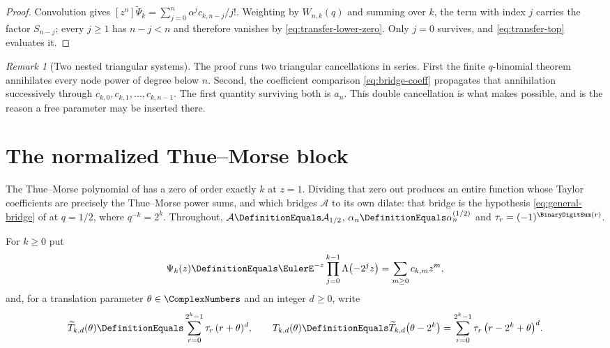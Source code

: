 \documentclass[11pt,a4paper,oneside,openany]{book}
\theoremstyle{definition}
\theoremstyle{remark}
\newtheorem{remark}[remark]{Remark}
\begin{document}
\begin{proof}
Convolution gives $[z^n]\widetilde\Psi_k=\sum_{j=0}^{n}\alpha^jc_{k,n-j}/j!$.  Weighting by $W_{n,k}(q)$ and summing over $k$, the term with index $j$ carries the factor $S_{n-j}$; every $j\ge1$ has $n-j<n$ and therefore vanishes by \eqref{eq:transfer-lower-zero}.  Only $j=0$ survives, and \eqref{eq:transfer-top} evaluates it.
\end{proof}

\begin{remark}[Two nested triangular systems]\label{rem:double-cancellation}
The proof runs two triangular cancellations in series.  First the finite $q$-binomial theorem annihilates every node power of degree below $n$.  Second, the coefficient comparison \eqref{eq:bridge-coeff} propagates that annihilation successively through $c_{k,0},c_{k,1},\ldots,c_{k,n-1}$.  The first quantity surviving both is $a_n$.  This double cancellation is what makes  possible, and  is the reason a free parameter may be inserted there.
\end{remark}

\section{The normalized Thue--Morse block}

The Thue--Morse polynomial of  has a zero of order exactly
$k$ at $z=1$.  Dividing that zero out produces an entire function whose Taylor
coefficients are precisely the Thue--Morse power sums, and which bridges $\mathcal A$ to
its own dilate: that bridge is the hypothesis \eqref{eq:general-bridge} of
 at $q=1/2$, where $q^{-k}=2^k$.  Throughout,
$\mathcal A\DefinitionEquals\mathcal A_{1/2}$, $\alpha_n\DefinitionEquals\alpha^{(1/2)}_n$ and
$\tau_r=(-1)^{\BinaryDigitSum(r)}$.

For $k\ge0$ put
\begin{equation}\label{eq:Psi-k-definition}
 \Psi_k(z)\DefinitionEquals\EulerE^{-z}\prod_{j=0}^{k-1}\Lambda\bigl(-2^jz\bigr)
 =\sum_{m\ge0}c_{k,m}z^m,
\end{equation}
and, for a translation parameter $\theta\in\ComplexNumbers$ and an integer $d\ge0$, write
\begin{equation}\label{eq:thue-morse-power-sums}
 \widetilde T_{k,d}(\theta)\DefinitionEquals\sum_{r=0}^{2^k-1}\tau_r\,(r+\theta)^d,
 \qquad
 T_{k,d}(\theta)\DefinitionEquals\widetilde T_{k,d}\bigl(\theta-2^k\bigr)
 =\sum_{r=0}^{2^k-1}\tau_r\,\bigl(r-2^k+\theta\bigr)^d .
\end{equation}
\end{document}

